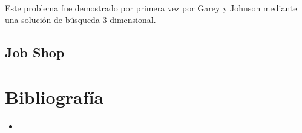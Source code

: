 \documentclass[11pt, a4paper,spanish]{article}
\begin{document}
				\paragraph{}
				Este problema fue demostrado por primera vez por Garey y Johnson mediante una solución de búsqueda 3-dimensional.
				
			
			
			\subsection{Job Shop}

	
	\newpage

		\section{Bibliografía}

			\begin{itemize}
			
				\item
		
			\end{itemize}
\end{document}
